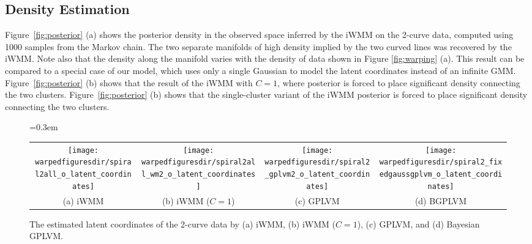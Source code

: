 \subsection{Density Estimation}
Figure~\ref{fig:posterior} (a) shows the posterior density in the observed space inferred by the iWMM on the 2-curve data, computed using 1000 samples from the Markov chain.
The two separate manifolds of high density implied by the two curved lines was recovered by the iWMM.  
Note also that the density along the manifold varies with the density of data shown in Figure \ref{fig:warping} (a).  
%
This result can be compared to a special case of our model, which uses only a single Gaussian to model the latent coordinates instead of an infinite GMM.
Figure~\ref{fig:posterior} (b) shows that the result of the iWMM with $C=1$,
where posterior is forced to place significant density 
connecting the two clusters.
Figure~\ref{fig:posterior} (b) shows that the single-cluster variant of the iWMM posterior is forced to place significant density connecting the two clusters.


\begin{figure*}%
\centering
{\tabcolsep=0.3em
\begin{tabular}{cccc}
\fbox{\texttt{[image: \\warpedfiguresdir/spiral2all\_o\_latent\_coordinates]}} &
\fbox{\texttt{[image: \\warpedfiguresdir/spiral2all\_wm2\_o\_latent\_coordinates]}} &
\fbox{\texttt{[image: \\warpedfiguresdir/spiral2\_gplvm2\_o\_latent\_coordinates]}} &
\fbox{\texttt{[image: \\warpedfiguresdir/spiral2\_fixedgaussgplvm\_o\_latent\_coordinates]}}\\
(a) iWMM & (b) iWMM ($C=1$) &
(c) GPLVM & (d) BGPLVM \\
\end{tabular}}
\caption[Copmarison of latent coordinate estimates]{The estimated latent coordinates of the 2-curve data by
(a) iWMM, (b) iWMM ($C=1$), (c) GPLVM, and (d) Bayesian GPLVM.}
\label{fig:latent}
\end{figure*}

